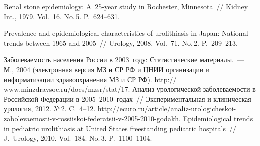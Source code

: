 \begin{multicols}{2}
{{\begin{thebibliography}{99}
Renal stone epidemiology: A~25-year study in Rochester, Minnesota~// Kidney Int., 1979. Vol.~16. 
No.\,5. P.~624--631.

 Prevalence and epidemiological characteristics of 
urolithiasis in Japan: National trends between 1965 and 2005~// Urology, 2008. Vol.~71. No.\,2. 
P.~209--213.

Заболеваемость населения России в 2003~году: Статистические материалы.~--- М., 2004 
(электронная версия МЗ и СР РФ и ЦНИИ организации и информатизации здравоохранения 
МЗ и СР РФ). 
{\sf http:// www.minzdravsoc.ru/docs/mzsr/stat/17}.
Анализ урологической заболеваемости в Российской Федерации в 2005--2010~годах~//
Экспериментальная и клиническая урология, 2012. №\,2. C.~4--12.
{\sf http://ecuro.ru/article/analiz-urologicheskoi-zabolevaemosti-v-rossiiskoi-federatsii-v-2005-2010-godakh}.
 Epidemiological trends in pediatric urolithiasis at 
United States freestanding pediatric hospitals~// J.~Urology, 2010. Vol.~184. No.\,3. P.~1100--1104.


\end{thebibliography}}}
\end{multicols}
